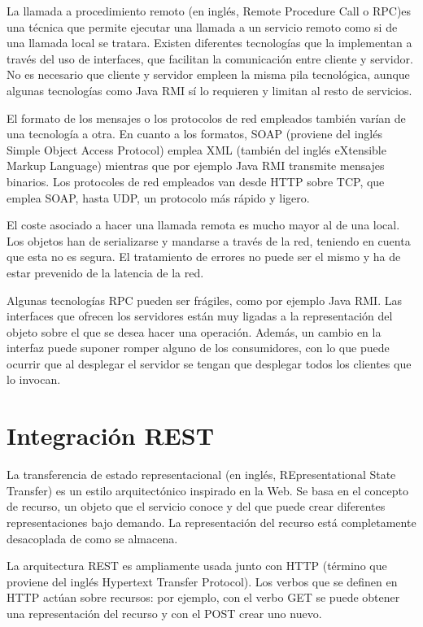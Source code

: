\documentclass[11pt,a4paper]{article}
\begin{document}
La llamada a procedimiento remoto (en inglés, Remote Procedure Call o RPC)es una técnica que permite ejecutar una llamada a un servicio remoto como si de una llamada local se tratara. Existen diferentes tecnologías que la implementan a través del uso de interfaces, que facilitan la comunicación entre cliente y servidor. No es necesario que cliente y servidor empleen la misma pila tecnológica, aunque algunas tecnologías como Java RMI sí lo requieren y limitan al resto de servicios.

El formato de los mensajes o los protocolos de red empleados también varían de una tecnología a otra. En cuanto a los formatos, SOAP (proviene del inglés Simple Object Access Protocol) emplea XML (también del inglés eXtensible Markup Language) mientras que por ejemplo Java RMI transmite mensajes binarios. Los protocoles de red empleados van desde HTTP sobre TCP, que emplea SOAP, hasta UDP, un protocolo más rápido y ligero.

El coste asociado a hacer una llamada remota es mucho mayor al de una local. Los objetos han de serializarse y mandarse a través de la red, teniendo en cuenta que esta no es segura. El tratamiento de errores no puede ser el mismo y ha de estar prevenido de la latencia de la red.

Algunas tecnologías RPC pueden ser frágiles, como por ejemplo Java RMI. Las interfaces que ofrecen los servidores están muy ligadas a la representación del objeto sobre el que se desea hacer una operación. Además, un cambio en la interfaz puede suponer romper alguno de los consumidores,  con lo que puede ocurrir que al desplegar el servidor se tengan que desplegar todos los clientes que lo invocan.

\section{Integración REST}

La transferencia de estado representacional (en inglés, REpresentational State Transfer) es un estilo arquitectónico inspirado en la Web. Se basa en el concepto de recurso, un objeto que el servicio conoce y del que puede crear diferentes representaciones bajo demando. La representación del recurso está completamente desacoplada de como se almacena.

La arquitectura REST es ampliamente usada junto con HTTP (término que proviene del inglés Hypertext Transfer Protocol). Los verbos que se definen en HTTP actúan sobre recursos: por ejemplo, con el verbo GET se puede obtener una representación del recurso y con el POST crear uno nuevo.
\end{document}
